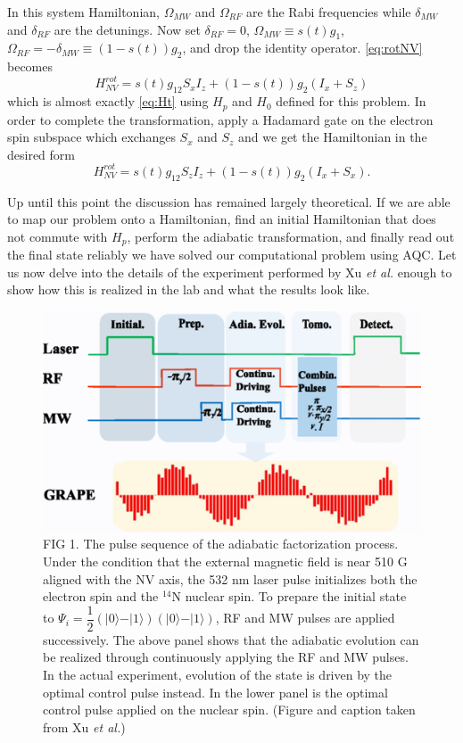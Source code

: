 \documentclass[%
 reprint,
 amsmath,amssymb,
 aps,
]{revtex4-1}
\begin{document}
	In this system Hamiltonian, $\Omega_{MW}$ and $\Omega_{RF}$ are the Rabi frequencies while $\delta_{MW}$ and $\delta_{RF}$ are the detunings. Now set $\delta_{RF}=0$, $\Omega_{MW}\equiv s(t)g_1$, $\Omega_{RF}=-\delta_{MW}\equiv \left(1-s(t)\right)g_2$, and drop the identity operator. \ref{eq:rotNV} becomes
	\begin{equation}
		H^{rot}_{NV} = s(t)g_12S_xI_z + \left(1-s(t)\right)g_2\left(I_x + S_z\right)
	\end{equation}
which is almost exactly \ref{eq:Ht} using $H_p$ and $H_0$ defined for this problem. In order to complete the transformation, apply a Hadamard gate on the electron spin subspace which exchanges $S_x$ and $S_z$ and we get the Hamiltonian in the desired form
	\begin{equation}
		H^{rot}_{NV} = s(t)g_12S_zI_z + \left(1-s(t)\right)g_2\left(I_x + S_x\right).
	\end{equation}
	
	Up until this point the discussion has remained largely theoretical. If we are able to map our problem onto a Hamiltonian, find an initial Hamiltonian that does not commute with $H_p$, perform the adiabatic transformation, and finally read out the final state reliably we have solved our computational problem using AQC. Let us now delve into the details of the experiment performed by Xu \textit{et al.} enough to show how this is realized in the lab and what the results look like. 

	\begin{figure}
	\includegraphics[scale=0.49]{Fig2XuEtAl}
	\caption{	
		FIG 1. The pulse sequence of the adiabatic factorization process. Under the condition that the external magnetic field is near 510 G aligned with the NV axis, the 532 nm laser pulse initializes both the electron spin and the $^{14}$N nuclear spin. To prepare the initial state to $\Psi_i = \dfrac{1}{2}\left(\vert 0 \rangle - \vert 1 \rangle   \right)\left(\vert 0 \rangle - \vert 1 \rangle   \right)$, RF and MW pulses are applied successively. The above panel shows that the adiabatic evolution can be realized through continuously applying the RF and MW pulses. In the actual experiment, evolution of the state is driven by the optimal control pulse instead. In the lower panel is the optimal control pulse applied on the nuclear spin. (Figure and caption taken from Xu \textit{et al.}\cite{Xu2017})
	}	
	\end{figure}
	\label{fig:pulse}
	
\end{document}
